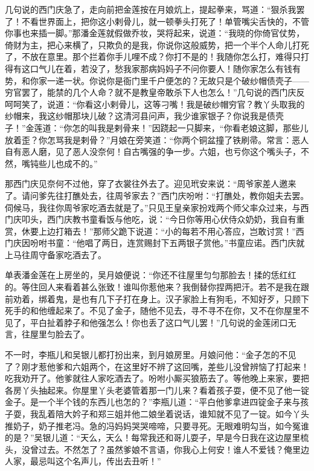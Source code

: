 几句说的西门庆急了，走向前把金莲按在月娘炕上，提起拳来，骂道：“狠杀我罢了！不看世界面上，把你这小\textShouWai 剌骨儿，就一顿拳头打死了！单管嘴尖舌快的，不管你事也来插一脚。”那潘金莲就假做乔妆，哭将起来，说道：“我晓的你倚官仗势，倚财为主，把心来横了，只欺负的是我，你说你这般威势，把一个半个人命儿打死了，不放在意里。那个拦着你手儿哩不成？你打不是的！我随你怎么打，难得只打得有这口气儿在着，若没了，愁我家那病妈妈子不问你要人！随你家怎么有钱有势，和你家一递一状。你说你是衙门里千户便怎的？无故只是个破纱帽债壳子——穷官罢了，能禁的几个人命？就不是教皇帝敢杀下人也怎么！”几句说的西门庆反呵呵笑了，说道：“你看这小\textShouWai 剌骨儿，这等刁嘴！我是破纱帽穷官？教丫头取我的纱帽来，我这纱帽那块儿破？这清河县问声，我少谁家银子？你说我是债壳子！”金莲道：“你怎的叫我是\textShouWai 剌骨来！”因跷起一只脚来，“你看老娘这脚，那些儿放着歪？你怎骂我是\textShouWai 剌骨？”月娘在旁笑道：“你两个铜盆撞了铁刷帚。常言：恶人自有恶人磨，见了恶人没奈何！自古嘴强的争一步。六姐，也亏你这个嘴头子，不然，嘴钝些儿也成不的。”

那西门庆见奈何不过他，穿了衣裳往外去了。迎见玳安来说：“周爷家差人邀来了。请问爹先往打醮处去，往周爷家去？”西门庆吩咐：“打醮处，教你姐夫去罢。伺候马，我往你周爷家吃酒去就是了。”只见王皇亲家扮戏两个师父率众过来，与西门庆叩头，西门庆教书童看饭与他吃，说：“今日你等用心伏侍众奶奶，我自有重赏，休要上边打箱去！”那师父跪下说道：“小的每若不用心答应，岂敢讨赏！”西门庆因吩咐书童：“他唱了两日，连赏赐封下五两银子赏他。”书童应诺。西门庆就上马往周守备家吃酒去了。

单表潘金莲在上房坐的，吴月娘便说：“你还不往屋里匀匀那脸去！揉的恁红红的。等住回人来看着甚么张致！谁叫你惹他来？我倒替你捏两把汗。若不是我在跟前劝着，绑着鬼，是也有几下子打在身上。汉子家脸上有狗毛，不知好歹，只顾下死手的和他缠起来了。不见了金子，随他不见去，寻不寻不在你，又不在你屋里不见了，平白扯着脖子和他强怎么！你也丢了这口气儿罢！”几句说的金莲闭口无言，往屋里匀脸去了。

不一时，李瓶儿和吴银儿都打扮出来，到月娘房里。月娘问他：“金子怎的不见了？刚才惹他爹和六姐两个，在这里好不辨了这回嘴，差些儿没曾辨恼了打起来！吃我劝开了。他爹就往人家吃酒去了。吩咐小厮买狼筋去了。等他晚上来家，要把各房丫头抽起来。你屋里丫头老婆管着那一门儿来？看着孩子耍，便不见了他一锭金子。是一个半个钱的东西儿也怎的？”李瓶儿道：“平白他爹拿进四锭金子来与孩子耍，我乱着陪大妗子和郑三姐并他二娘坐着说话，谁知就不见了一锭。如今丫头推奶子，奶子推老冯。急的冯妈妈哭哭啼啼，只要寻死。无眼难明勾当，如今冤谁的是？”吴银儿道：“天么，天么！每常我还和哥儿耍子，早是今日我在这边屋里梳头，没曾过去。不然怎了？虽然爹娘不言语，你我心上何安！谁人不爱钱？俺里边人家，最忌叫这个名声儿，传出去丑听！”


